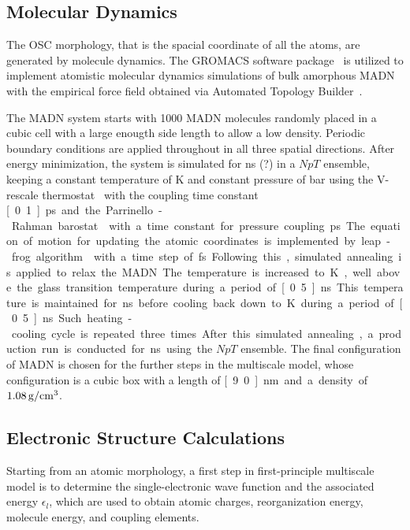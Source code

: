 \documentclass[%
 reprint,
 amsmath,amssymb,
 aps,
]{revtex4-2}
\begin{document}
\subsection{Molecular Dynamics}
The OSC morphology, that is the spacial coordinate of all the atoms, are generated by molecule dynamics. The GROMACS software package~\cite{berendsen_gromacs_1995} is utilized to implement atomistic molecular dynamics simulations of bulk amorphous MADN with the empirical force field obtained via Automated Topology Builder~\cite{stroet_automated_2018}.

The MADN system starts with 1000 MADN molecules randomly placed in a cubic cell with a large enougth side length to allow a low density. Periodic boundary conditions are applied throughout in all three spatial directions. After energy minimization, the system is simulated for \unit[1]{ns} (?) in a $NpT$ ensemble, keeping a constant temperature of \unit[300]{K} and constant pressure of \unit[1]{bar} using the V-rescale thermostat~\cite{bussi_canonical_2007} with the coupling time constant \unit[0.1]{ps} and the Parrinello-Rahman barostat~\cite{parrinello_polymorphic_1981} with a time constant for pressure coupling \unit[2]{ps}. 
The equation of motion for updating the atomic coordinates is implemented by leap-frog algorithm~\cite{van_gunsteren_leap} with a time step of \unit[1]{fs}. 

Following this, simulated annealing is applied to relax the MADN.  
The temperature is increased to \unit[800]{K}, well above the glass transition temperature during a period of \unit[0.5]{ns}. 
This temperature is maintained for \unit[1]{ns} before cooling back down to \unit[300]{K} during a period of \unit[0.5]{ns}.
Such heating-cooling cycle is repeated three times. After this simulated annealing, a production run is conducted for \unit[2]{ns} using the $NpT$ ensemble. The final configuration of MADN is chosen for the further steps in the multiscale model, whose configuration is a cubic box with a length of \unit[9.0]{nm} and a density of $\unit[1.08]{g/cm^3}$. 

\subsection{Electronic Structure Calculations} 
\label{sec:es}
Starting from an atomic morphology, a first step in first-principle multiscale model is to determine the single-electronic wave function and the associated energy $\epsilon_l$, which are used to obtain atomic charges, reorganization energy, molecule energy, and coupling elements.
\end{document}
